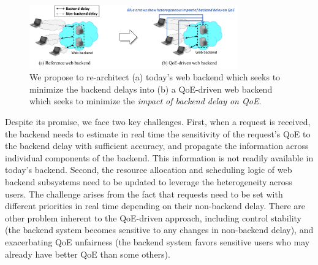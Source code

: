 \begin{figure}[t]
	\centering
	\vspace{-0.5cm}
	\includegraphics[width=0.8\textwidth]{figs/intro-overview-new.pdf}
	\vspace{-0.4cm}
	\caption{We propose to re-architect (a) today's web backend which seeks to minimize the backend delays into (b) a QoE-driven web backend which seeks to minimize the {\em impact of backend delay on QoE}.}
	\label{fig:intro-overview}
\end{figure}





Despite its promise, we face two key challenges.
First, when a request is received, the backend needs to estimate in real time the sensitivity of the request's QoE to the backend delay with sufficient accuracy, and propagate the information across individual components of the backend. This information is not readily available in today's backend.
Second, the resource allocation and scheduling logic of web backend subsystems need to be updated to leverage the heterogeneity across users. The challenge arises from the fact that requests need to be set with different priorities in real time depending on their non-backend delay.
There are other problem inherent to the QoE-driven approach, including control stability (\ie the backend system becomes sensitive to any changes in non-backend delay), and exacerbating QoE unfairness (\ie the backend system favors sensitive users who may already have better QoE than some others).


